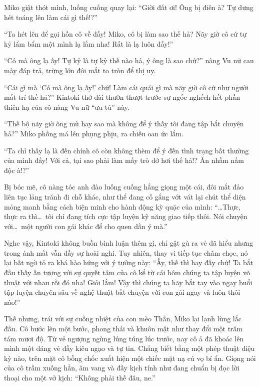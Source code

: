 \documentclass[../main.tex]{subfiles}
\begin{document}
Miko giật thót mình, luống cuống quay lại: ``Giời đất ơi! Ông bị điên à? Tự dưng hét toáng lên làm cái gì thế!?''

``Ta hét lên để gọi hồn cô về đấy! Miko, cô bị làm sao thế hả? Nãy giờ cô cứ tự kỷ lẩm bẩm một mình lạ lắm nha! Rất là lạ luôn đấy!''

``Có mà ông lạ ấy! Tự kỷ là tự kỷ thế nào hả, ý ông là sao chứ?'' nàng Vu nữ cau mày đáp trả, trừng lớn đôi mắt to tròn để thị uy.

``Cái gì mà `Có mà ông lạ ấy!' chứ! Làm cái quái gì mà nãy giờ cô cứ như người mất trí thế hả?'' Kintoki thở dài thườn thượt trước sự ngốc nghếch hết phần thiên hạ của cô nàng Vu nữ ``ưu tú'' này.

``Thế bộ nãy giờ ông mù hay sao mà không để ý thấy tôi đang tập bắt chuyện hả?'' Miko phồng má lên phụng phịu, ra chiều oan ức lắm.

``Ta chỉ thấy lạ là đến chính cô còn không thèm để ý đến tình trạng bất thường của mình đấy! Với cả, tại sao phải làm mấy trò dở hơi thế hả!? Ăn nhầm nấm độc à!?''

Bị bóc mẽ, cô nàng tóc anh đào luống cuống hắng giọng một cái, đôi mắt đảo liên tục lảng tránh đi chỗ khác, như thể đang cố gắng vớt vát lại chút thể diện mỏng manh bằng cách biện minh cho hành động kỳ quặc của mình: ``\dots Thực, thực ra thì\dots\ tôi chỉ đang tích cực tập luyện kỹ năng giao tiếp thôi. Nói chuyện với\dots\ một người con gái khác để cho quen dần ý mà.''

Nghe vậy, Kintoki không buồn bình luận thêm gì, chỉ gật gù ra vẻ đã hiểu nhưng trong ánh mắt vẫn đầy sự hoài nghi. Tuy nhiên, thay vì tiếp tục châm chọc, nó lại bất ngờ tỏ ra khá hào hứng với ý tưởng này: ``Ấy, thế thì hay đấy chứ! Ta bắt đầu thấy ấn tượng với sự quyết tâm của cô kể từ cái hôm chúng ta tập luyện võ thuật với nhau rồi đó nha! Giỏi lắm! Vậy thì chúng ta hãy bắt tay vào ngay buổi tập luyện chuyên sâu về nghệ thuật bắt chuyện với con gái ngay và luôn thôi nào!''

Thế nhưng, trái với sự cuồng nhiệt của con mèo Thần, Miko lại lạnh lùng lắc đầu. Cô bước lên một bước, phong thái và khuôn mặt như thay đổi một trăm tám mươi độ. Từ vẻ ngượng ngùng lúng túng lúc trước, nay cô ả đã khoác lên mình một dáng vẻ đầy kiêu ngạo và tự tin. Chẳng biết bằng một phép thuật diệu kỳ nào, trên mặt cô bỗng chốc xuất hiện một chiếc mặt nạ cú vọ bí ẩn. Giọng nói của cô trầm xuống hẳn, âm vang và đầy kịch tính như đang chuẩn bị đọc lời thoại cho một vở kịch: ``Không phải thế đâu, ne.''
\end{document}
